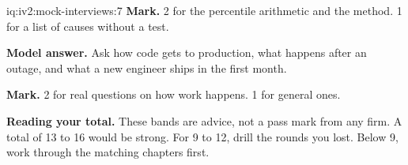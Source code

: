 \begin{solution}{iq:iv2:mock-interviews:7}
\textbf{Mark.} 2 for the percentile arithmetic and the method. 1 for a list of causes without a test.

\ivstop
\textbf{Model answer.} Ask how code gets to production, what happens after an outage, and what a new engineer ships in the first month.

\textbf{Mark.} 2 for real questions on how work happens. 1 for general ones.

\medskip
\textbf{Reading your total.} These bands are advice, not a pass mark from any firm. A total of 13 to 16 would be strong. For 9 to 12, drill the rounds you lost. Below 9, work through the matching chapters first.

\end{solution}

